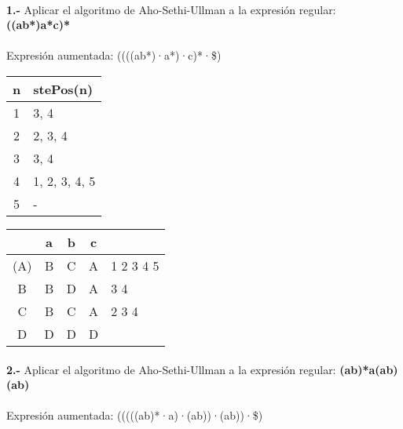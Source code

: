 \documentclass[11pt,a4paper]{report}
\begin{document}
\paragraph{}

\paragraph{}
\textbf{1.-} Aplicar el algoritmo de Aho-Sethi-Ullman a la expresión regular: \textbf{((a\textbar b*)a*c)*} \\
\\
Expresión aumentada: ((((a\textbar b*)·a*)·c)*·\$) \\

\begin{tabular} {| c | l |}
\hline
n & stePos(n) \\ \hline
1 & 3, 4 \\ \hline
2 & 2, 3, 4 \\ \hline
3 & 3, 4 \\ \hline
4 & 1, 2, 3, 4, 5 \\ \hline
5 & - \\ \hline
\end{tabular}
\quad
\begin{tabular} {| c | c |c |c | l |}
\hline 
& a & b & c & \\ \hline
(A) & B & C & A & 1 2 3 4 5 \\ \hline
B & B & D & A & 3 4 \\ \hline
C & B & C & A & 2 3 4 \\ \hline
D & D & D & D & \\ \hline
\end{tabular}\paragraph{}
\textbf{2.-} Aplicar el algoritmo de Aho-Sethi-Ullman a la expresión regular: \textbf{(a\textbar b)*a(a\textbar b)(a\textbar b)} \\
\\
Expresión aumentada: (((((a\textbar b)*·a)·(a\textbar b))·(a\textbar b))·\$) \\
\end{document}
